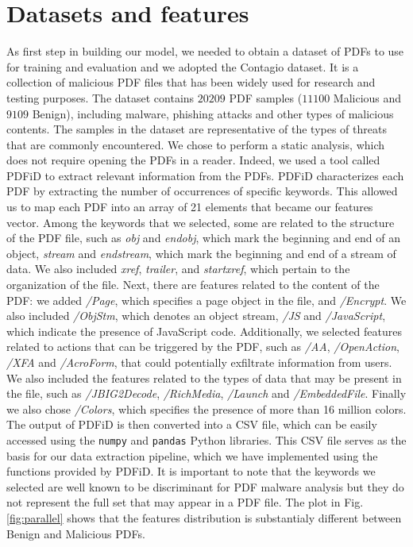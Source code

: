 \documentclass[twocolumn, switch]{article} %
\begin{document}
\section{Datasets and features}
\label{sec:datasetsandfeatures}
As first step in building our model, we needed to obtain a dataset of PDFs to use for training and evaluation and we adopted the Contagio dataset. It is a collection of malicious PDF files that has been widely used for research and testing purposes. The dataset contains $20209$ PDF samples ($11100$ Malicious and $9109$ Benign), including malware, phishing attacks and other types of malicious contents. The samples in the dataset are representative of the types of threats that are commonly encountered.\newline
We chose to perform a static analysis, which does not require opening the PDFs in a reader. Indeed, we used a tool called PDFiD to extract relevant information from the PDFs. PDFiD characterizes each PDF by extracting the number of occurrences of specific keywords. This allowed us to map each PDF into an array of 21 elements that became our features vector.\newline
Among the keywords that we selected, some are related to the structure of the PDF file, such as \textit{obj} and \textit{endobj}, which mark the beginning and end of an object, \textit{stream} and \textit{endstream}, which mark the beginning and end of a stream of data. We also included \textit{xref}, \textit{trailer}, and \textit{startxref}, which pertain to the organization of the file. Next, there are features related to the content of the PDF: we added \textit{/Page}, which specifies a page object in the file, and \textit{/Encrypt}. We also included \textit{/ObjStm}, which denotes an object stream, \textit{/JS} and \textit{/JavaScript}, which indicate the presence of JavaScript code. Additionally, we selected features related to actions that can be triggered by the PDF, such as \textit{/AA}, \textit{/OpenAction}, \textit{/XFA} and \textit{/AcroForm}, that could potentially exfiltrate information from users. We also included the features related to the types of data that may be present in the file, such as \textit{/JBIG2Decode}, \textit{/RichMedia}, \textit{/Launch} and \textit{/EmbeddedFile}. Finally we also chose \textit{/Colors}, which specifies the presence of more than 16 million colors.\newline
The output of PDFiD is then converted into a CSV file, which can be easily accessed using the \texttt{numpy} and \texttt{pandas} Python libraries. This CSV file serves as the basis for our data extraction pipeline, which we have implemented using the functions provided by PDFiD. It is important to note that the keywords we selected are well known to be discriminant for PDF malware analysis but they do not represent the full set that may appear in a PDF file.\newline
The plot in Fig. \ref{fig:parallel} shows that the features distribution is substantialy different between Benign and Malicious PDFs.
\end{document}
